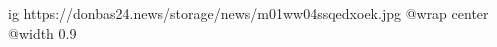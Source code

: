  
 
 
 
 

\ifcmt
  ig https://donbas24.news/storage/news/m01ww04ssqedxoek.jpg
  @wrap center
  @width 0.9
\fi

